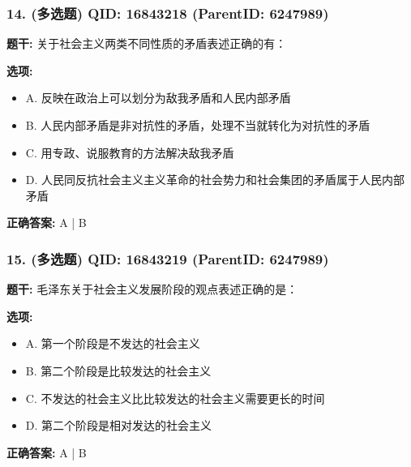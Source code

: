 \documentclass[12pt,UTF8]{ctexart}
\begin{document}
\subsubsection*{14. (多选题) \small QID: 16843218 (ParentID: 6247989)}

\textbf{题干:}
关于社会主义两类不同性质的矛盾表述正确的有：



\textbf{选项:}
\begin{itemize}[leftmargin=*]

  \item A. 反映在政治上可以划分为敌我矛盾和人民内部矛盾

  \item B. 人民内部矛盾是非对抗性的矛盾，处理不当就转化为对抗性的矛盾

  \item C. 用专政、说服教育的方法解决敌我矛盾

  \item D. 人民同反抗社会主义主义革命的社会势力和社会集团的矛盾属于人民内部矛盾

\end{itemize}

\textbf{正确答案:}
A | B

\vspace{0.3em}\hrulefill\vspace{0.7em}

\subsubsection*{15. (多选题) \small QID: 16843219 (ParentID: 6247989)}

\textbf{题干:}
毛泽东关于社会主义发展阶段的观点表述正确的是：



\textbf{选项:}
\begin{itemize}[leftmargin=*]

  \item A. 第一个阶段是不发达的社会主义

  \item B. 第二个阶段是比较发达的社会主义

  \item C. 不发达的社会主义比比较发达的社会主义需要更长的时间

  \item D. 第二个阶段是相对发达的社会主义

\end{itemize}

\textbf{正确答案:}
A | B
\end{document}
